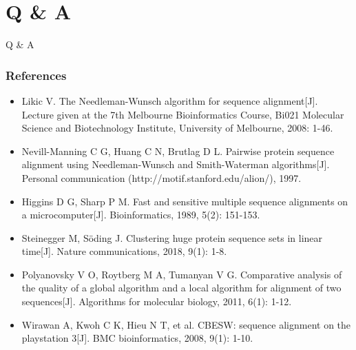 \documentclass[UTF8]{beamer}
\begin{document}
	\section{Q \& A}
	\begin{frame}
		\Huge{\centerline{Q \& A}}
	\end{frame}
	\begin{frame}
		\frametitle{References}
		\begin{itemize}
			\tiny
			\item Likic V. The Needleman-Wunsch algorithm for sequence alignment[J]. Lecture given at the 7th Melbourne Bioinformatics Course, Bi021 Molecular Science and Biotechnology Institute, University of Melbourne, 2008: 1-46.
			\item Nevill-Manning C G, Huang C N, Brutlag D L. Pairwise protein sequence alignment using Needleman-Wunsch and Smith-Waterman algorithms[J]. Personal communication (http://motif.stanford.edu/alion/), 1997.
			\item Higgins D G, Sharp P M. Fast and sensitive multiple sequence alignments on a microcomputer[J]. Bioinformatics, 1989, 5(2): 151-153.
			\item Steinegger M, Söding J. Clustering huge protein sequence sets in linear time[J]. Nature communications, 2018, 9(1): 1-8.
			\item Polyanovsky V O, Roytberg M A, Tumanyan V G. Comparative analysis of the quality of a global algorithm and a local algorithm for alignment of two sequences[J]. Algorithms for molecular biology, 2011, 6(1): 1-12.
			\item Wirawan A, Kwoh C K, Hieu N T, et al. CBESW: sequence alignment on the playstation 3[J]. BMC bioinformatics, 2008, 9(1): 1-10.
		\end{itemize}
	\end{frame}
\end{document}
